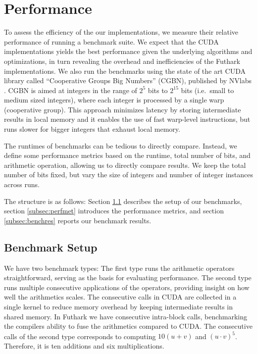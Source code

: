 \section{Performance}
\label{sec:per}

To assess the efficiency of the our implementations, we measure their relative
performance of running a benchmark suite. We expect that the CUDA
implementations yields the best performance given the underlying algorithms and
optimizations, in turn revealing the overhead and inefficiencies of the Futhark
implementations. We also run the benchmarks using the state of the art CUDA
library called ``Cooperative Groups Big Numbers'' (CGBN), published by NVlabs
\cite{CGBN}. CGBN is aimed at integers in the range of $2^5$ bits to $2^{15}$
bits (i.e.\ small to medium sized integers), where each integer is processed by
a single warp (cooperative group). This approach minimizes latency by storing
intermediate results in local memory and it enables the use of fast warp-level
instructions, but runs slower for bigger integers that exhaust local memory.

The runtimes of benchmarks can be tedious to directly compare. Instead, we
define some performance metrics based on the runtime, total number of bits, and
arithmetic operation, allowing us to directly compare results. We keep the total
number of bits fixed, but vary the size of integers and number of integer
instances across runs.

The structure is as follows: Section \ref{subsec:benchset} describes the setup
of our benchmarks, section \ref{subsec:perfmet} introduces the performance
metrics, and section \ref{subsec:benchres} reports our benchmark results.

\subsection{Benchmark Setup}
\label{subsec:benchset}

We have two benchmark types: The first type runs the arithmetic operators
straightforward, serving as the basis for evaluating performance. The second
type runs multiple consecutive applications of the operators, providing insight
on how well the arithmetics scales. The consecutive calls in CUDA are collected
in a single kernel to reduce memory overhead by keeping intermediate results in
shared memory. In Futhark we have consecutive intra-block calls, benchmarking
the compilers ability to fuse the arithmetics compared to CUDA. The consecutive
calls of the second type corresponds to computing $10(u+v)$ and $(u\cdot
v)^5$. Therefore, it is ten additions and six multiplications.

